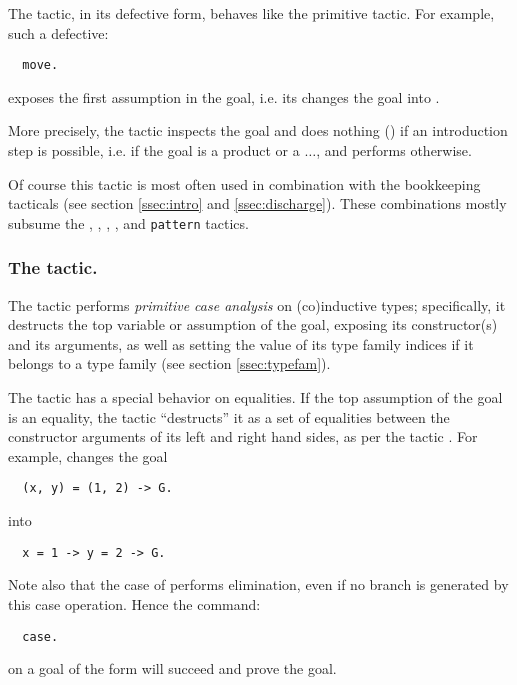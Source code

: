 The  tactic, in its
defective form, behaves like the primitive  \Coq{} tactic. For
example, such a defective:
\begin{lstlisting}
  move.
\end{lstlisting}
exposes the first assumption in the goal, i.e. its changes the goal
 into .

More precisely, the  tactic inspects the goal and does nothing
() if an introduction step is possible, i.e. if the
goal is a product or a $\dots$, and performs 
otherwise.

Of course this tactic is most often used in combination with the
bookkeeping tacticals (see section \ref{ssec:intro} and
\ref{ssec:discharge}). These combinations mostly subsume the ,
, , ,  and
\textcolor{dkblue}{\texttt{pattern}} tactics.


\subsubsection*{The  tactic.}

The  tactic performs
\emph{primitive case analysis} on (co)inductive types; specifically,
it destructs the top variable or assumption of the goal,
exposing its constructor(s) and its arguments, as well as setting the value
of its type family indices if it belongs to a type family
(see section \ref{ssec:typefam}).

The \ssr{}  tactic has a special behavior on
equalities.
If the top assumption of the goal is an equality, the  tactic
``destructs'' it as a set of equalities between the constructor
arguments of its left and right hand sides, as per the
tactic .
For example,  changes the goal
\begin{lstlisting}
  (x, y) = (1, 2) -> G.
\end{lstlisting}
into
\begin{lstlisting}
  x = 1 -> y = 2 -> G.
\end{lstlisting}

Note also that the case of \ssr{} performs 
elimination, even if no branch is generated by this case operation.
Hence the command:
\begin{lstlisting}
  case.
\end{lstlisting}
on a goal of the form  will succeed and prove the goal.

